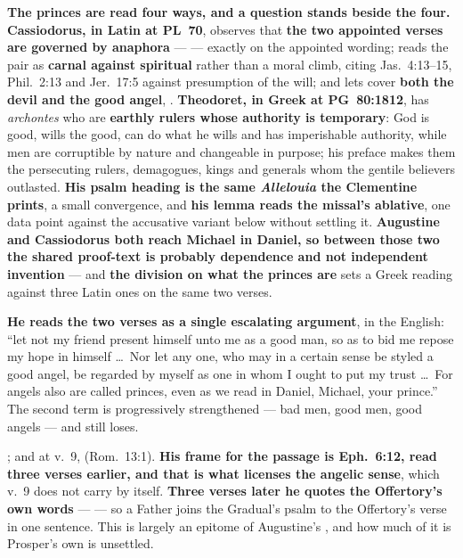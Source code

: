 \textbf{The princes are read four ways, and a question stands beside the four.}
\textbf{Cassiodorus, in Latin at PL~70}, observes that \textbf{the two
appointed verses are governed by anaphora} ---  --- exactly on the appointed wording;
reads the pair as \textbf{carnal against spiritual} rather than a moral climb,
citing Jas.~4:13--15, Phil.~2:13 and Jer.~17:5 against presumption of the will;
and lets  cover \textbf{both the devil and the good angel},
.
\textbf{Theodoret, in Greek at PG~80:1812}, has \emph{archontes} who are
\textbf{earthly rulers whose authority is temporary}: God is good, wills the good, can do what he wills and has
imperishable authority, while men are corruptible by nature and changeable in
purpose; his preface makes them the persecuting rulers, demagogues, kings and
generals whom the gentile believers outlasted. \textbf{His psalm heading is the
same \emph{Allelouia} the Clementine prints}, a small convergence, and
\textbf{his lemma reads the missal's ablative}, one data point against the
accusative variant below without settling it. \textbf{Augustine and Cassiodorus
both reach Michael in Daniel, so between those two the shared proof-text is
probably dependence and not independent invention} --- and \textbf{the
division on what the princes are} sets a Greek reading against three
Latin ones on the same two verses.

\begin{witnessnote}
\textbf{He reads the two verses as a single
escalating argument}, in the  English:
``let not my friend present himself unto me as a good man,
so as to bid me repose my hope in himself \dots\ Nor let any one, who may in a
certain sense be styled a good angel, be regarded by myself as one in whom I
ought to put my trust \dots\ For angels also are called princes, even as we read
in Daniel, Michael, your prince.'' The second term is progressively strengthened
--- bad men, good men, good angels --- and still loses.
\end{witnessnote}

\begin{witnessnote}
; and at v.~9,  (Rom.\
13:1). \textbf{His frame for the passage is Eph.\ 6:12, read three verses
earlier, and that is what licenses the angelic sense}, which v.~9 does not carry
by itself. \textbf{Three verses later he quotes the Offertory's own
words} --- \latin{ut gustemus et videamus quam suavis est Dominus} --- so a
Father joins the Gradual's psalm to the Offertory's verse in one sentence.
This \work{Expositio} is largely an epitome of Augustine's
, and how much of it is Prosper's own is unsettled.
\end{witnessnote}

